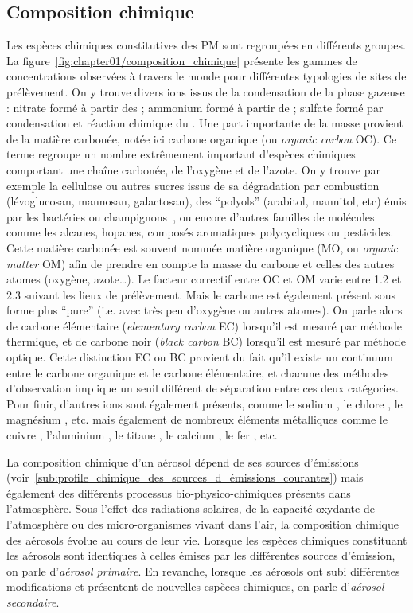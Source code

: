 \subsection{Composition chimique}%
\label{ssub:composition_chimique}

Les espèces chimiques constitutives des PM sont regroupées en différents groupes. La
figure~\ref{fig:chapter01/composition_chimique} présente les gammes de concentrations
observées à travers le monde pour différentes typologies de sites de prélèvement.
On y trouve divers ions issus de la condensation de la phase gazeuse : nitrate \NOt{} formé à
partir des ; ammonium \NHq{} formé à partir de \NHt; sulfate \SOq{} formé par
condensation et réaction chimique du .
Une part importante de la masse provient de la matière carbonée, notée ici
carbone organique (ou \textit{organic carbon} OC). Ce terme regroupe un nombre extrêmement
important d'espèces chimiques comportant une chaîne carbonée, de l'oxygène et
de l'azote. On y trouve par exemple la cellulose ou autres sucres issus de sa
dégradation par combustion (lévoglucosan, mannosan, galactosan), des ``polyols'' (arabitol,
mannitol, etc) émis par les bactéries ou champignons~\autocite{samakePolyols2019}, ou encore
d'autres familles de molécules comme les alcanes, hopanes, composés aromatiques
polycycliques ou pesticides. Cette matière carbonée est souvent nommée matière
organique (MO, ou \textit{organic matter} OM) afin de prendre en compte la masse du
carbone et celles des autres atomes (oxygène, azote…). Le facteur correctif entre OC et OM
varie entre 1.2 et 2.3 suivant les lieux de prélèvement.
Mais le carbone est également présent sous forme plus ``pure'' (i.e. avec très peu
d'oxygène ou autres atomes).
On parle alors de carbone élémentaire (\textit{elementary carbon} EC) lorsqu'il est mesuré
par méthode thermique, et de carbone noir (\textit{black carbon} BC) lorsqu'il est mesuré
par méthode optique. Cette distinction EC ou BC provient du fait qu'il existe un continuum
entre le carbone organique et le carbone élémentaire, et chacune des méthodes
d'observation implique un seuil différent de séparation entre ces deux catégories.
Pour finir, d'autres ions sont également présents, comme le sodium , le chlore
, le magnésium , etc. mais également de nombreux éléments métalliques
comme le cuivre , l'aluminium , le titane , le calcium , le fer
, etc.

La composition chimique d'un aérosol dépend de ses sources d'émissions
(voir~\ref{sub:profile_chimique_des_sources_d_émissions_courantes}) mais également des
différents processus bio-physico-chimiques présents dans l'atmosphère. Sous l'effet des
radiations solaires, de la capacité oxydante de l'atmosphère ou des micro-organismes
vivant dans l'air, la composition chimique des aérosols évolue au cours de leur vie.
Lorsque les espèces chimiques constituant les aérosols sont identiques à celles émises par
les différentes sources d'émission, on parle d'\textit{aérosol primaire}. En revanche,
lorsque les aérosols ont subi différentes modifications et présentent de nouvelles espèces
chimiques, on parle d'\textit{aérosol secondaire}.

